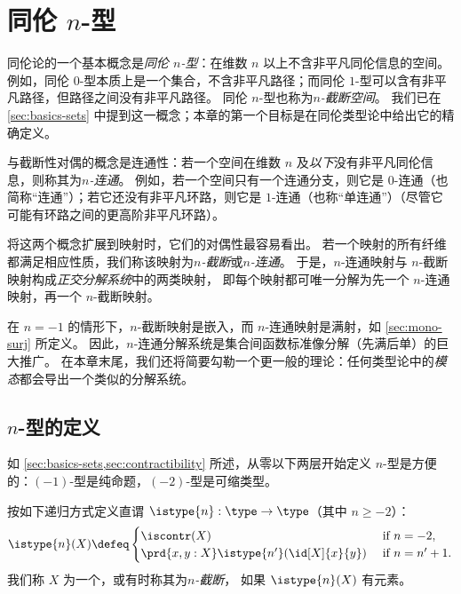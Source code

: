 \chapter{同伦 \texorpdfstring{$n$}{n}-型}
\label{cha:hlevels}

%

同伦论的一个基本概念是\emph{同伦 $n$-型}：在维数 $n$ 以上不含非平凡同伦信息的空间。
例如，同伦 $0$-型本质上是一个集合，不含非平凡路径；而同伦 $1$-型可以含有非平凡路径，但路径之间没有非平凡路径。
同伦 $n$-型也称为\emph{$n$-截断空间}。
我们已在 \cref{sec:basics-sets} 中提到这一概念；本章的第一个目标是在同伦类型论中给出它的精确定义。

与截断性对偶的概念是连通性：若一个空间在维数 $n$ 及\emph{以下}没有非平凡同伦信息，则称其为\emph{$n$-连通}。
例如，若一个空间只有一个连通分支，则它是 $0$-连通（也简称“连通”）；若它还没有非平凡环路，则它是 $1$-连通（也称“单连通”）（尽管它可能有环路之间的更高阶非平凡环路）。

将这两个概念扩展到映射时，它们的对偶性最容易看出。
若一个映射的所有纤维都满足相应性质，我们称该映射为\emph{$n$-截断}或\emph{$n$-连通}。
于是，$n$-连通映射与 $n$-截断映射构成\emph{正交分解系统}中的两类映射，
即每个映射都可唯一分解为先一个 $n$-连通映射，再一个 $n$-截断映射。

在 $n={-1}$ 的情形下，$n$-截断映射是嵌入，而 $n$-连通映射是满射，如 \cref{sec:mono-surj} 所定义。
因此，$n$-连通分解系统是集合间函数标准像分解（先满后单）的巨大推广。
在本章末尾，我们还将简要勾勒一个更一般的理论：任何类型论中的\emph{模态}都会导出一个类似的分解系统。


\section{\texorpdfstring{$n$}{n}-型的定义}
\label{sec:n-types}

如 \cref{sec:basics-sets,sec:contractibility} 所述，从零以下两层开始定义 $n$-型是方便的：$(-1)$-型是纯命题，$(-2)$-型是可缩类型。

\begin{defn}\label{def:hlevel}
  按如下递归方式定义直谓 $\istype{n} : \type \to \type$（其中 $n \geq -2$）：
  \[ \istype{n}(X) \defeq
  \begin{cases}
    \iscontr(X) & \text{ if } n = -2, \\
    \prd{x,y : X} \istype{n'}(\id[X]{x}{y}) & \text{ if } n = n'+1.
  \end{cases}
  \]
  我们称 $X$ 为一个，或有时称其为\emph{$n$-截断}，
 如果 $\istype{n}(X)$ 有元素。
\end{defn}

